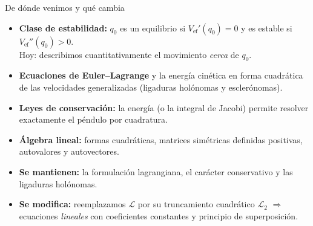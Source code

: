\documentclass[spanish]{beamer}
\newcommand{\Vef}{V_{\mathrm{ef}}}
\begin{document}
\begin{frame}{De dónde venimos y qué cambia}
\begin{itemize}
\item<1-> \textbf{Clase de estabilidad:} $q_0$ es un equilibrio si $\Vef'(q_0)=0$ y es estable si $\Vef''(q_0)>0$. \\
\alert{Hoy:} describimos cuantitativamente el movimiento \emph{cerca} de $q_0$.
\item<2-> \textbf{Ecuaciones de Euler--Lagrange} y la energía cinética en forma cuadrática de las velocidades generalizadas (ligaduras holónomas y esclerónomas).
\item<3-> \textbf{Leyes de conservación:} la energía (o la integral de Jacobi) permite resolver exactamente el péndulo por cuadratura.
\item<4-> \textbf{Álgebra lineal:} formas cuadráticas, matrices simétricas definidas positivas, autovalores y autovectores.
\item<5-> \textbf{Se mantienen:} la formulación lagrangiana, el carácter conservativo y las ligaduras holónomas.
\item<6-> \textbf{Se modifica:} reemplazamos $\mathcal{L}$ por su truncamiento cuadrático $\mathcal{L}_2$ $\Rightarrow$ ecuaciones \emph{lineales} con coeficientes constantes y principio de superposición.
\end{itemize}
\end{frame}
\end{document}
